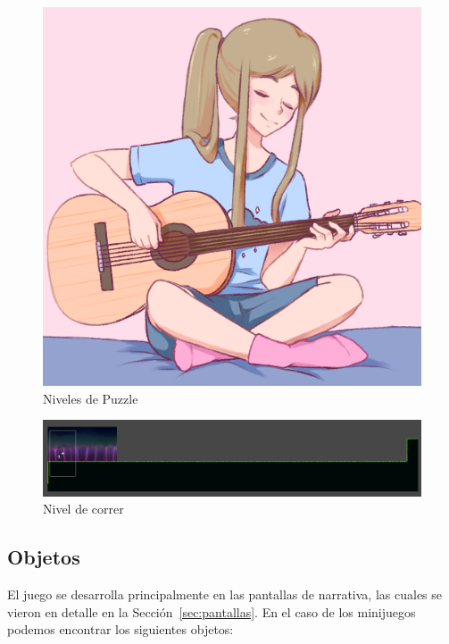 \begin{figure}
\begin{minipage}{.3\textwidth}
    \end{minipage}
    \begin{minipage}{.3\textwidth}
        \includegraphics[width=\textwidth]{imgs/Memory3.png}
    \end{minipage}
    \caption{Niveles de Puzzle}
    \label{multifig:puzzle-level}
\end{figure}

\begin{figure}
    \centering
    \includegraphics[width=\textwidth]{imgs/run-level.png}
    \caption{Nivel de correr}
    \label{fig:run-level}
\end{figure}


\subsection{Objetos}
El juego se desarrolla principalmente en las pantallas de narrativa, las cuales se vieron en detalle en la Sección~\ref{sec:pantallas}. En el caso de los minijuegos podemos encontrar los siguientes objetos:


